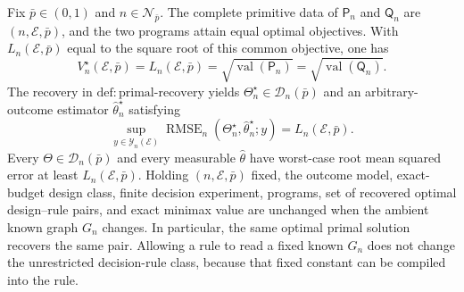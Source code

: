 Fix \(\bar p\in(0,1)\) and \(n\in\mathcal N_{\bar p}\). The complete primitive data of \(\mathsf P_n\) and \(\mathsf Q_n\) are \((n,\mathcal E,\bar p)\), and the two programs attain equal optimal objectives. With \(L_n(\mathcal E,\bar p)\) equal to the square root of this common objective, one has
\[
 V_n^\star(\mathcal E,\bar p)=L_n(\mathcal E,\bar p)
 =\sqrt{\operatorname{val}(\mathsf P_n)}
 =\sqrt{\operatorname{val}(\mathsf Q_n)}.
\]
The recovery in \(\mathrm{def{:}primal\text{-}recovery}\) yields \(\Theta_n^\star\in\mathcal D_n(\bar p)\) and an arbitrary-outcome estimator \(\widehat\theta_n^\star\) satisfying
\[
 \sup_{y\in\mathcal Y_n(\mathcal E)}
 \operatorname{RMSE}_n(\Theta_n^\star,\widehat\theta_n^\star;y)
 =L_n(\mathcal E,\bar p).
\]
Every \(\Theta\in\mathcal D_n(\bar p)\) and every measurable \(\widehat\theta\) have worst-case root mean squared error at least \(L_n(\mathcal E,\bar p)\). Holding \((n,\mathcal E,\bar p)\) fixed, the outcome model, exact-budget design class, finite decision experiment, programs, set of recovered optimal design--rule pairs, and exact minimax value are unchanged when the ambient known graph \(G_n\) changes. In particular, the same optimal primal solution recovers the same pair. Allowing a rule to read a fixed known \(G_n\) does not change the unrestricted decision-rule class, because that fixed constant can be compiled into the rule.